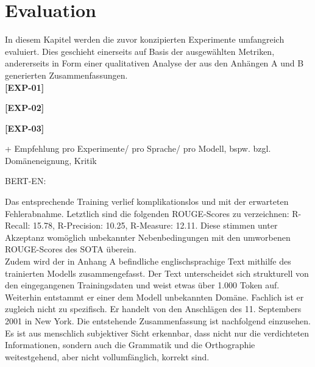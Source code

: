 \chapter{Evaluation}
\thispagestyle{fancy}
\label{chap:Evaluation}

\noindent
In diesem Kapitel werden die zuvor konzipierten Experimente umfangreich evaluiert. Dies geschieht einerseits auf Basis der ausgewählten Metriken, andererseits in Form einer qualitativen Analyse der aus den Anhängen A und B generierten Zusammenfassungen.\\

\noindent
\textbf{[EXP-01]}\\
\noindent

\noindent
\textbf{[EXP-02]}\\
\noindent

\noindent
\textbf{[EXP-03]}\\
\noindent

+ Empfehlung pro Experimente/ pro Sprache/ pro Modell, bspw. bzgl. Domäneneignung, Kritik

BERT-EN:

Das entsprechende Training verlief komplikationslos und mit der erwarteten Fehlerabnahme. Letztlich sind die folgenden \ac{ROUGE}-Scores zu verzeichnen: R-Recall: 15.78, R-Precision: 10.25, R-Measure: 12.11. Diese stimmen unter Akzeptanz womöglich unbekannter Nebenbedingungen mit den umworbenen \ac{ROUGE}-Scores des \ac{SOTA} überein.\\

\noindent
Zudem wird der in Anhang A befindliche englischsprachige Text mithilfe des trainierten Modells zusammengefasst. Der Text unterscheidet sich strukturell von den eingegangenen Trainingsdaten und weist etwas über 1.000 Token auf. Weiterhin entstammt er einer dem Modell unbekannten Domäne. Fachlich ist er zugleich nicht zu spezifisch. Er handelt von den Anschlägen des 11. Septembers 2001 in New York. Die entstehende Zusammenfassung ist nachfolgend einzusehen. Es ist aus menschlich subjektiver Sicht erkennbar, dass nicht nur die verdichteten Informationen, sondern auch die Grammatik und die Orthographie weitestgehend, aber nicht vollumfänglich, korrekt sind.\\

\noindent{}\\


